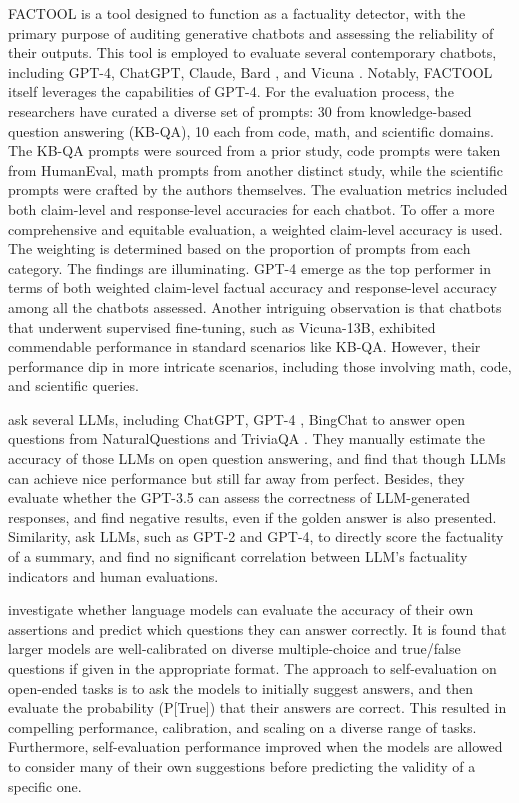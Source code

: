 FACTOOL \citep{chern2023factool} is a tool designed to function as a factuality detector, with the primary purpose of auditing generative chatbots and assessing the reliability of their outputs. This tool is employed to evaluate several contemporary chatbots, including GPT-4, ChatGPT, Claude, Bard \citep{bard}, and Vicuna \citep{vicuna2023}. Notably, FACTOOL itself leverages the capabilities of GPT-4.
For the evaluation process, the researchers have curated a diverse set of prompts: 30 from knowledge-based question answering (KB-QA), 10 each from code, math, and scientific domains. The KB-QA prompts were sourced from a prior study, code prompts were taken from HumanEval, math prompts from another distinct study, while the scientific prompts were crafted by the authors themselves.
The evaluation metrics included both claim-level and response-level accuracies for each chatbot. To offer a more comprehensive and equitable evaluation, a weighted claim-level accuracy is used. The weighting is determined based on the proportion of prompts from each category.
The findings are illuminating. GPT-4 emerge as the top performer in terms of both weighted claim-level factual accuracy and response-level accuracy among all the chatbots assessed. Another intriguing observation is that chatbots that underwent supervised fine-tuning, such as Vicuna-13B, exhibited commendable performance in standard scenarios like KB-QA. However, their performance dip in more intricate scenarios, including those involving math, code, and scientific queries.

\citet{wang2023evaluating} ask several LLMs, including ChatGPT, GPT-4 \citep{GPT4}, BingChat \citep{BingChat} to answer open questions from NaturalQuestions \citep{NQ} and TriviaQA \citep{TQ}. They manually estimate the accuracy of those LLMs on open question answering, and find that though LLMs can achieve nice performance but still far away from perfect. Besides, they evaluate whether the GPT-3.5 can assess the correctness of LLM-generated responses, and find negative results, even if the golden answer is also presented.
Similarity, \citet{fu2023large} ask LLMs, such as GPT-2 and GPT-4, to directly score the factuality of a summary, and find  no significant correlation  between LLM's factuality indicators and human evaluations.


\citet{kadavath2022language} investigate whether language models can evaluate the accuracy of their own assertions and predict which questions they can answer correctly. It is found that larger models are well-calibrated on diverse multiple-choice and true/false questions if given in the appropriate format.
The approach to self-evaluation on open-ended tasks is to ask the models to initially suggest answers, and then evaluate the probability (P[True]) that their answers are correct. This resulted in compelling performance, calibration, and scaling on a diverse range of tasks. Furthermore, self-evaluation performance improved when the models are allowed to consider many of their own suggestions before predicting the validity of a specific one.


